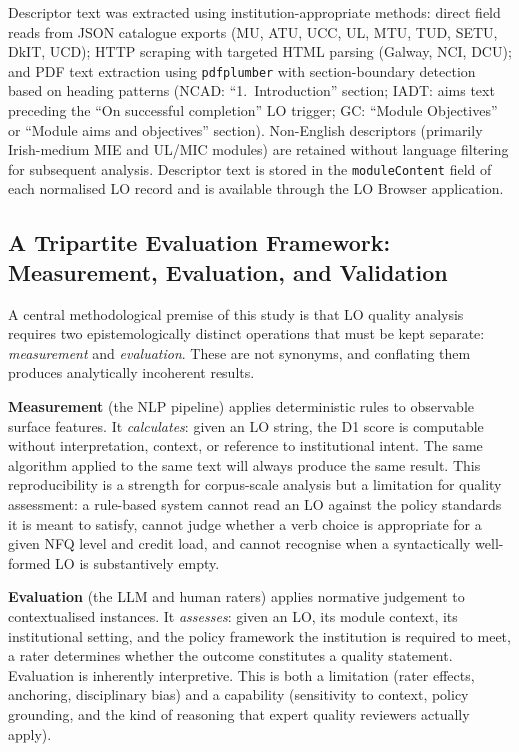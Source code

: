 \documentclass[12pt, a4paper]{article}
\begin{document}
\noindent
Descriptor text was extracted using institution-appropriate methods: direct field
reads from JSON catalogue exports (MU, ATU, UCC, UL, MTU, TUD, SETU, DkIT, UCD);
HTTP scraping with targeted HTML parsing (Galway, NCI, DCU); and PDF text extraction
using \texttt{pdfplumber} with section-boundary detection based on heading patterns
(NCAD: ``1.~Introduction'' section; IADT: aims text preceding the ``On successful
completion'' LO trigger; GC: ``Module Objectives'' or ``Module aims and objectives''
section). Non-English descriptors (primarily Irish-medium MIE and
UL/MIC modules) are retained without language filtering for subsequent analysis.
Descriptor text is stored in the \texttt{moduleContent} field of each normalised LO
record and is available through the LO Browser application.

\subsection{A Tripartite Evaluation Framework: Measurement, Evaluation, and Validation}
\label{sec:tripartite}

A central methodological premise of this study is that LO quality analysis requires
two epistemologically distinct operations that must be kept separate: \textit{measurement}
and \textit{evaluation}. These are not synonyms, and conflating them produces analytically
incoherent results.

\textbf{Measurement} (the NLP pipeline) applies deterministic rules to observable surface
features. It \textit{calculates}: given an LO string, the D1 score is computable without
interpretation, context, or reference to institutional intent. The same algorithm applied
to the same text will always produce the same result. This reproducibility is a strength
for corpus-scale analysis but a limitation for quality assessment: a rule-based system
cannot read an LO against the policy standards it is meant to satisfy, cannot judge
whether a verb choice is appropriate for a given NFQ level and credit load, and cannot
recognise when a syntactically well-formed LO is substantively empty.

\textbf{Evaluation} (the LLM and human raters) applies normative judgement to contextualised
instances. It \textit{assesses}: given an LO, its module context, its institutional
setting, and the policy framework the institution is required to meet, a rater determines
whether the outcome constitutes a quality statement. Evaluation is inherently interpretive.
This is both a limitation (rater effects, anchoring, disciplinary bias) and a capability
(sensitivity to context, policy grounding, and the kind of reasoning that expert quality
reviewers actually apply).
\end{document}
